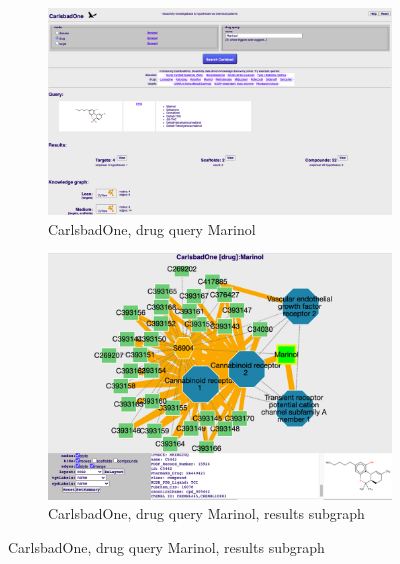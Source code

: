 \begin{figure}
\centering
\begin{subfigure}{0.8\textwidth}
\includegraphics[width=0.95\linewidth]{figures/carlsbad/CARLSBAD_CBOne_Marinol_01.png} 
\caption{CarlsbadOne, drug query Marinol}
\label{fig:cb_cbone_01}
\end{subfigure}
\begin{subfigure}{0.8\textwidth}
\includegraphics[width=0.95\linewidth]{figures/carlsbad/CARLSBAD_CBOne_Marinol_02.png}
\caption{CarlsbadOne, drug query Marinol, results subgraph}
\label{fig:cb_cbone_02}
\end{subfigure}
\caption{CarlsbadOne, drug query Marinol, results subgraph}
\label{fig:cb_cbone_03}
\end{figure}


